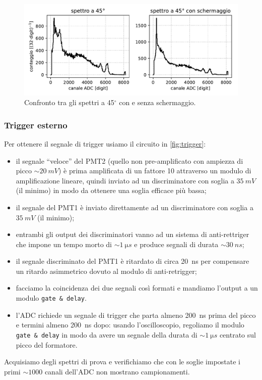 \begin{figure}
	\centering
	\includegraphics[width=\textwidth]{plotcasetta}
	\caption{Confronto tra gli spettri a 45$^{\circ}$ con e senza schermaggio.}
	\label{casetta}
\end{figure}

\subsubsection{Trigger esterno}
Per ottenere il segnale di trigger usiamo il circuito in \autoref{fig:trigger}:
\begin{itemize}
	\item il segnale ``veloce'' del PMT2 (quello non pre-amplificato con ampiezza di picco $\sim\SI{20}{mV}$) è prima amplificata di un fattore 10 attraverso un modulo di amplificazione lineare, quindi inviato ad un discriminatore con soglia a $\SI{35}{mV}$ (il minimo) in modo da ottenere una soglia efficace più bassa;
	\item il segnale del PMT1 è inviato direttamente ad un discriminatore con soglia a $\SI{35}{mV}$ (il minimo);
	\item entrambi gli output dei discriminatori vanno ad un sistema di anti-rettriger che impone un tempo morto di $\sim\SI{1}{\micro s}$ e produce segnali di durata $\sim\SI{30}{ns}$;
	\item il segnale discriminato del PMT1 è ritardato di circa \SI{20}{ns} per compensare un ritardo asimmetrico dovuto al modulo di anti-retrigger;
	\item facciamo la coincidenza dei due segnali così formati e mandiamo l'output a un modulo \texttt{gate \& delay}.
	\item l'ADC richiede un segnale di trigger che parta almeno \SI{200}{ns} prima del picco e termini almeno \SI{200}{ns} dopo: usando l'oscilloscopio, regoliamo il modulo \texttt{gate \& delay} in modo da avere un segnale della durata di $\sim\SI{1}{\micro s}$ centrato sul picco del formatore.
\end{itemize}
Acquisiamo degli spettri di prova e verifichiamo che con le soglie impostate i primi $\sim1000$ canali dell'ADC non mostrano campionamenti.

